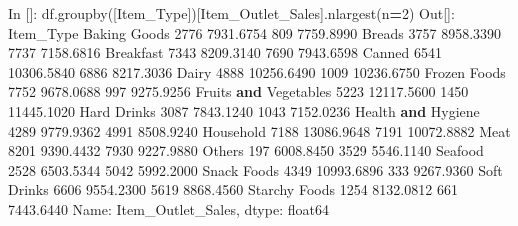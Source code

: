 \documentclass[
]{book}
\newenvironment{Shaded}{\begin{snugshade}}{\end{snugshade}}
\newcommand{\DecValTok}[1]{\textcolor[rgb]{0.00,0.00,0.81}{#1}}
\newcommand{\FloatTok}[1]{\textcolor[rgb]{0.00,0.00,0.81}{#1}}
\newcommand{\KeywordTok}[1]{\textcolor[rgb]{0.13,0.29,0.53}{\textbf{#1}}}
\newcommand{\NormalTok}[1]{#1}
\newcommand{\OperatorTok}[1]{\textcolor[rgb]{0.81,0.36,0.00}{\textbf{#1}}}
\newcommand{\StringTok}[1]{\textcolor[rgb]{0.31,0.60,0.02}{#1}}
\begin{document}
\begin{Shaded}
\begin{Highlighting}[]
\NormalTok{In []: df.groupby([}\StringTok{\textquotesingle{}Item\_Type\textquotesingle{}}\NormalTok{])[}\StringTok{\textquotesingle{}Item\_Outlet\_Sales\textquotesingle{}}\NormalTok{].nlargest(n}\OperatorTok{=}\DecValTok{2}\NormalTok{)}
\NormalTok{Out[]:}
\NormalTok{Item\_Type                  }
\NormalTok{Baking Goods           }\DecValTok{2776}     \FloatTok{7931.6754}
                       \DecValTok{809}      \FloatTok{7759.8990}
\NormalTok{Breads                 }\DecValTok{3757}     \FloatTok{8958.3390}
                       \DecValTok{7737}     \FloatTok{7158.6816}
\NormalTok{Breakfast              }\DecValTok{7343}     \FloatTok{8209.3140}
                       \DecValTok{7690}     \FloatTok{7943.6598}
\NormalTok{Canned                 }\DecValTok{6541}    \FloatTok{10306.5840}
                       \DecValTok{6886}     \FloatTok{8217.3036}
\NormalTok{Dairy                  }\DecValTok{4888}    \FloatTok{10256.6490}
                       \DecValTok{1009}    \FloatTok{10236.6750}
\NormalTok{Frozen Foods           }\DecValTok{7752}     \FloatTok{9678.0688}
                       \DecValTok{997}      \FloatTok{9275.9256}
\NormalTok{Fruits }\KeywordTok{and}\NormalTok{ Vegetables  }\DecValTok{5223}    \FloatTok{12117.5600}
                       \DecValTok{1450}    \FloatTok{11445.1020}
\NormalTok{Hard Drinks            }\DecValTok{3087}     \FloatTok{7843.1240}
                       \DecValTok{1043}     \FloatTok{7152.0236}
\NormalTok{Health }\KeywordTok{and}\NormalTok{ Hygiene     }\DecValTok{4289}     \FloatTok{9779.9362}
                       \DecValTok{4991}     \FloatTok{8508.9240}
\NormalTok{Household              }\DecValTok{7188}    \FloatTok{13086.9648}
                       \DecValTok{7191}    \FloatTok{10072.8882}
\NormalTok{Meat                   }\DecValTok{8201}     \FloatTok{9390.4432}
                       \DecValTok{7930}     \FloatTok{9227.9880}
\NormalTok{Others                 }\DecValTok{197}      \FloatTok{6008.8450}
                       \DecValTok{3529}     \FloatTok{5546.1140}
\NormalTok{Seafood                }\DecValTok{2528}     \FloatTok{6503.5344}
                       \DecValTok{5042}     \FloatTok{5992.2000}
\NormalTok{Snack Foods            }\DecValTok{4349}    \FloatTok{10993.6896}
                       \DecValTok{333}      \FloatTok{9267.9360}
\NormalTok{Soft Drinks            }\DecValTok{6606}     \FloatTok{9554.2300}
                       \DecValTok{5619}     \FloatTok{8868.4560}
\NormalTok{Starchy Foods          }\DecValTok{1254}     \FloatTok{8132.0812}
                       \DecValTok{661}      \FloatTok{7443.6440}
\NormalTok{Name: Item\_Outlet\_Sales, dtype: float64}
\end{Highlighting}
\end{Shaded}
\end{document}
